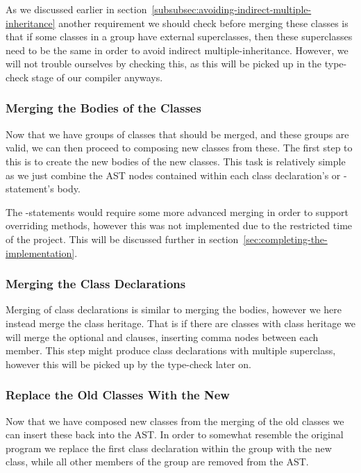 As we discussed earlier in section~\vref{subsubsec:avoiding-indirect-multiple-inheritance} another requirement we should check before merging these classes is that if some classes in a group have external superclasses, then these superclasses need to be the same in order to avoid indirect multiple-inheritance.
However, we will not trouble ourselves by checking this, as this will be picked up in the type-check stage of our compiler anyways.

\subsubsection{Merging the Bodies of the Classes}

Now that we have groups of classes that should be merged, and these groups are valid, we can then proceed to composing new classes from these.
The first step to this is to create the new bodies of the new classes.
This task is relatively simple as we just combine the AST nodes contained within each class declaration's or -statement's body.

The -statements would require some more advanced merging in order to support overriding methods, however this was not implemented due to the restricted time of the project.
This will be discussed further in section~\vref{sec:completing-the-implementation}.


\subsubsection{Merging the Class Declarations}

Merging of class declarations is similar to merging the bodies, however we here instead merge the class heritage.
That is if there are classes with class heritage we will merge the optional  and  clauses, inserting comma nodes between each member.
This step might produce class declarations with multiple superclass, however this will be picked up by the type-check later on.

\subsubsection{Replace the Old Classes With the New}

Now that we have composed new classes from the merging of the old classes we can insert these back into the AST.
In order to somewhat resemble the original program we replace the first class declaration within the group with the new class, while all other members of the group are removed from the AST\@.
